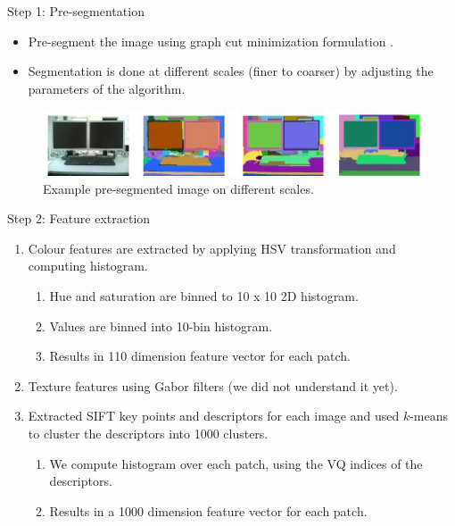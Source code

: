 \documentclass{beamer}
\begin{document}
\begin{frame}{Step 1: Pre-segmentation}
    \begin{itemize}
        \item Pre-segment the image using graph cut minimization formulation \cite{Felzenszwalb:2004}.
        \item Segmentation is done at different scales (finer to coarser) by adjusting the parameters of the algorithm.        
    \end{itemize}
    \begin{figure}[!hbp]
        \centering
        \includegraphics[width=0.9\linewidth]{images/seg_ex}
        \caption{Example pre-segmented image on different scales.}
        \label{fig_seg_ex}
    \end{figure}
\end{frame}

\begin{frame}{Step 2: Feature extraction}
  \begin{enumerate}
   \item Colour features are extracted by applying HSV transformation and computing histogram.
  \begin{enumerate}
  \item Hue and saturation are binned to 10 x 10 2D histogram.
  \item Values are binned into 10-bin histogram.
  \item Results in 110 dimension feature vector for each patch.
 \end{enumerate}
  \item Texture features using Gabor filters (we did not understand it yet).
  \item Extracted SIFT key points and descriptors for each image and used $k$-means to cluster the descriptors into 1000 clusters.
  \begin{enumerate}
      \item We compute histogram over each patch, using the VQ indices of the descriptors.
      \item Results in a 1000 dimension feature vector for each patch.
  \end{enumerate}        
  \end{enumerate}
\end{frame}
\end{document}
